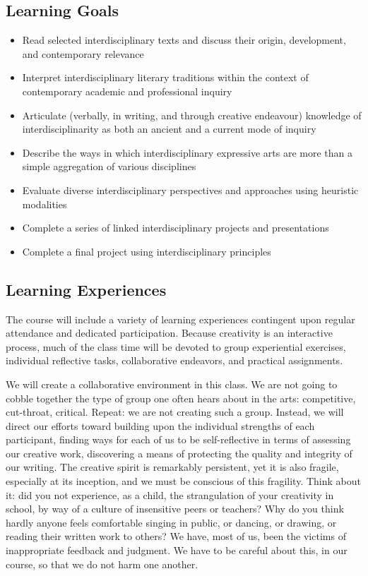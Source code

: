 \documentclass{report}
\begin{document}
\subsection{Learning Goals}
\begin{itemize}

\item Read selected interdisciplinary texts and discuss their origin, development, and contemporary relevance
\item Interpret interdisciplinary literary traditions within the context of contemporary academic and professional inquiry
\item Articulate (verbally, in writing, and through creative endeavour) knowledge of interdisciplinarity as both an ancient and a current mode of inquiry
\item Describe the ways in which interdisciplinary expressive arts are more than a simple aggregation of various disciplines
\item Evaluate diverse interdisciplinary perspectives and approaches using heuristic modalities
\item Complete a series of linked interdisciplinary projects and presentations
\item Complete a final project using interdisciplinary principles

\end{itemize}
\clearpage

\subsection{Learning Experiences}
The course will include a variety of learning experiences contingent upon regular attendance and dedicated participation. Because creativity is an interactive process, much of the class time will be devoted to group experiential exercises, individual reflective tasks, collaborative endeavors, and practical assignments.

We will create a collaborative environment in this class. We are not going to cobble together the type of group one often hears about in the arts: competitive, cut-throat, critical. Repeat: we are not creating such a group. Instead, we will direct our efforts toward building upon the individual strengths of each participant, finding ways for each of us to be self-reflective in terms of assessing our creative work, discovering a means of protecting the quality and integrity of our writing. The creative spirit is remarkably persistent, yet it is also fragile, especially at its inception, and
we must be conscious of this fragility. Think about it: did you not experience, as a child, the strangulation of your creativity in school, by way of a culture of insensitive peers or teachers? Why do you think hardly anyone feels comfortable singing in public, or dancing, or drawing, or reading their written work to others? We have, most of us, been the victims of inappropriate feedback and judgment. We have to be careful about this, in our course, so that we do not harm one another.
\end{document}
